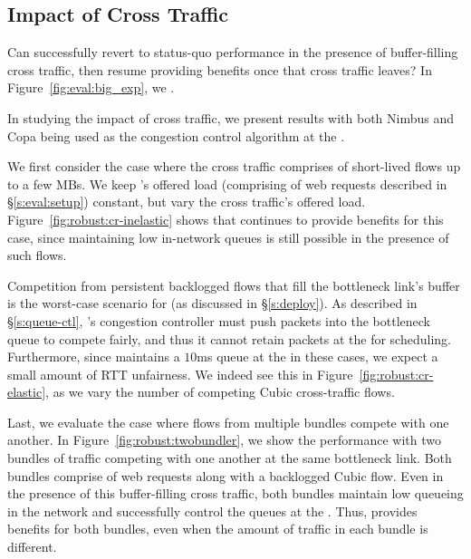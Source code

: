 \subsection{Impact of Cross Traffic}
\label{s:robust:cross}


Can \name successfully revert to status-quo performance in the presence of buffer-filling cross traffic, then resume providing benefits once that cross traffic leaves?
In Figure~\ref{fig:eval:big_exp}, we .

In studying the impact of cross traffic, we present results with both Nimbus and Copa being used as the congestion control algorithm at the \inbox.


 We first consider the case where the cross traffic comprises of short-lived flows up to a few MBs.
We keep \name's offered load (comprising of web requests described in \S\ref{s:eval:setup}) constant, but vary the cross traffic's offered load.
Figure~\ref{fig:robust:cr-inelastic} shows that \name continues to provide benefits for this case, since maintaining low in-network queues is still possible in the presence of such flows.


 Competition from persistent backlogged flows that fill the bottleneck link's buffer is the worst-case scenario for \name (as discussed in \S\ref{s:deploy}).
As described in \S\ref{s:queue-ctl}, \name's congestion controller must push packets into the bottleneck queue to compete fairly, and thus it cannot retain packets at the \inbox for scheduling. 
Furthermore, since \name maintains a $10$ms queue at the \inbox in these cases, we expect a small amount of RTT unfairness. 
We indeed see this in Figure~\ref{fig:robust:cr-elastic}, as we vary the number of competing Cubic cross-traffic flows.


 Last, we evaluate the case where flows from multiple bundles compete with one another. 
In Figure~\ref{fig:robust:twobundler}, we show the performance with two bundles of traffic competing with one another at the same bottleneck link. 
Both bundles comprise of web requests along with a backlogged Cubic flow. 
Even in the presence of this buffer-filling cross traffic, both bundles maintain low queueing in the network and successfully control the queues at the \inbox.
Thus, \name provides benefits for both bundles, even when the amount of traffic in each bundle is different.  

